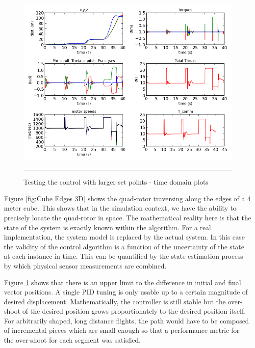 \begin{figure}[htbp]
	\centering
		\includegraphics[width=\textwidth]{Figures/largeSetpointDifferencesTest_timedomain.png}
		\rule{35em}{0.5pt}
	\caption[largeSetpointDifferencesTesttimedomain]{Testing the control with larger set points - time domain plots }
	\label{fig:largeSetpointDifferencesTesttimedomain}
\end{figure}



Figure \ref{fig:Cube Edges 3D} shows the quad-rotor traversing along the edges of a 4 meter cube. This shows that in the simulation context, we have the ability to precisely locate the quad-rotor in space. The mathematical reality here is that the state of the system is exactly known within the algorithm. For a real implementation, the system model is replaced by the actual system. In this case the validity of the control algorithm is a function of the uncertainty of the state at each instance in time. This can be quantified by the state estimation process by which physical sensor measurements are combined. 




Figure \ref{fig:largeSetpointDifferencesTesttimedomain} shows that there is an upper limit to the difference in initial and final vector positions. A single PID tuning is only usable up to a certain magnitude of desired displacement. Mathematically, the controller is still stable but the over-shoot of the desired position grows proportionately to the desired position itself. For arbitrarily shaped, long distance flights, the path would have to be composed of incremental pieces which are small enough so that a performance metric for the over-shoot for each segment was satisfied.



